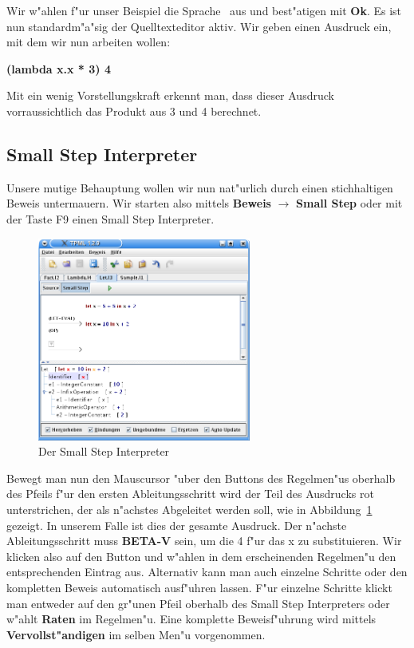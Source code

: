 Wir w"ahlen f"ur unser Beispiel die Sprache \LONE\ aus und best"atigen
mit {\bf Ok}. Es ist nun standardm"a"sig der Quelltexteditor aktiv.
Wir geben einen Ausdruck ein, mit dem wir nun arbeiten wollen:

{\bf (lambda x.x * 3) 4}

Mit ein wenig Vorstellungskraft erkennt man, dass dieser Ausdruck
vorraussichtlich das Produkt aus 3 und 4 berechnet.


\subsection{Small Step Interpreter}
Unsere mutige Behauptung wollen wir nun nat"urlich durch einen
stichhaltigen Beweis untermauern. Wir starten also mittels {\bf
Beweis} $\rightarrow$ {\bf Small Step} oder mit der Taste F9 einen
Small Step Interpreter.

\begin{figure}[h]
\begin{center}
\includegraphics[width=7cm]{images/small-step.png}
\caption{Der Small Step Interpreter}
\label{FigureSmallStep}
\end{center}
\end{figure}

Bewegt man nun den Mauscursor "uber den Buttons des Regelmen"us
oberhalb des Pfeils f"ur den ersten Ableitungsschritt wird der Teil
des Ausdrucks rot unterstrichen, der als n"achstes Abgeleitet werden
soll, wie in Abbildung~\ref{FigureSmallStep} gezeigt.
In unserem Falle ist dies der gesamte Ausdruck. Der n"achste
Ableitungsschritt muss {\bf BETA-V} sein, um die 4 f"ur das x zu
substituieren. Wir klicken also auf den Button und w"ahlen in dem
erscheinenden Regelmen"u den entsprechenden Eintrag aus. Alternativ
kann man auch einzelne Schritte oder den kompletten Beweis
automatisch ausf"uhren lassen. F"ur einzelne Schritte klickt man
entweder auf den gr"unen Pfeil oberhalb des Small Step Interpreters
oder w"ahlt {\bf Raten} im Regelmen"u. Eine komplette Beweisf"uhrung
wird mittels {\bf Vervollst"andigen} im selben Men"u vorgenommen.

